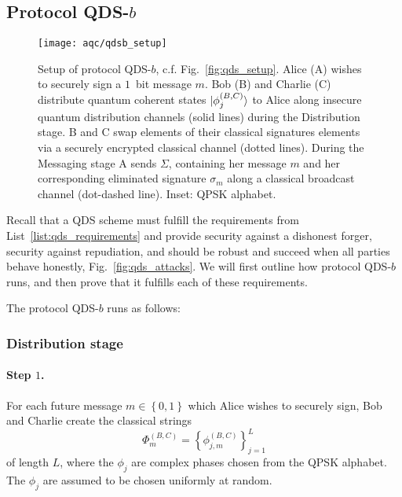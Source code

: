 \subsection{Protocol QDS-$b$}\label{sec:aqc_qdsb}


\begin{figure}[htp]
\captionsetup{width=0.8\linewidth}
\centering
\texttt{[image: aqc/qdsb\_setup]}
\caption{\label{fig:qdsb_setup} Setup of protocol QDS-$b$, c.f. Fig.~\ref{fig:qds_setup}. Alice (A) wishes to securely sign a $1$~bit message $m$. Bob (B) and Charlie (C) distribute quantum coherent states $\ket{\phi_j^{\left(B, C\right)}}$ to Alice along insecure quantum distribution channels (solid lines) during the Distribution stage. B and C swap elements of their classical signatures elements via a securely encrypted classical channel (dotted lines). During the Messaging stage A sends $\Sigma$, containing her message $m$ and her corresponding eliminated signature $\sigma_m$ along a classical broadcast channel (dot-dashed line). Inset: QPSK alphabet.}
\end{figure}

Recall that a QDS scheme must fulfill the requirements from List~\ref{list:qds_requirements} and provide security against a dishonest forger, security against repudiation, and should be robust and succeed when all parties behave honestly, Fig.~\ref{fig:qds_attacks}. We will first outline how protocol QDS-$b$ runs, and then prove that it fulfills each of these requirements.

The protocol QDS-$b$ runs as follows:

\subsubsection*{Distribution stage}

\paragraph{Step $1$.}
For each future message $m \in \left\{0, 1\right\}$ which Alice wishes to securely sign, Bob and Charlie create the classical strings
\begin{equation}
\Phi_m^{\left(B, C\right)} = \left\{\phi_{j, m}^{\left(B, C\right)}\right\}_{j=1}^L
\end{equation}
of length $L$, where the $\phi_j$ are complex phases chosen from the QPSK alphabet. The $\phi_j$ are assumed to be chosen uniformly at random.


